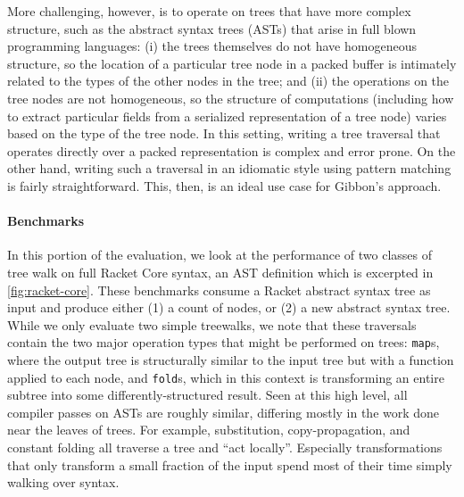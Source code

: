 \documentclass[a4paper,english]{lipics-v2016}
\newcommand{\treelang}{Gibbon\xspace} %
\begin{document}
More challenging, however, is to operate on trees that have more complex
structure, such as the abstract syntax trees (ASTs) that arise in full blown
programming languages: (i) the trees themselves do not have homogeneous structure, so the
location of a particular tree node in a packed buffer is intimately related to
the types of the other nodes in the tree; and (ii) the operations on the tree
nodes are not homogeneous, so the structure of computations (including how to
extract particular fields from a serialized representation of a tree node)
varies based on the type of the tree node. In this setting, writing a tree
traversal that operates directly over a packed representation is complex and
error prone. On the other hand, writing such a traversal in an idiomatic style
using pattern matching is fairly straightforward. This, then, is an ideal use
case for \treelang{}'s approach.

\paragraph*{Benchmarks}
In this portion of the evaluation, we look at
the performance of two classes of tree walk
on full Racket Core syntax, an AST definition which is excerpted in \cref{fig:racket-core}.
%
These benchmarks consume a Racket abstract syntax tree as input and produce
either (1) a count of nodes, or (2) a new abstract syntax tree.
%
While we only evaluate two simple treewalks,
we note that these traversals contain the two major operation
types that might be performed on trees: {\tt map}s, where the output tree is
structurally similar to the input tree but with a function applied to each node,
and {\tt fold}s, which in this context is transforming an entire subtree into
some differently-structured result.
%
Seen at this high level, all compiler passes on ASTs
are roughly similar, differing mostly in the work done near the leaves of
trees.
%
For example, substitution, copy-propagation, and constant folding all traverse a
tree and ``act locally''.  Especially transformations that only transform a
small fraction of the input spend most of their time simply walking over syntax.
%
\end{document}
